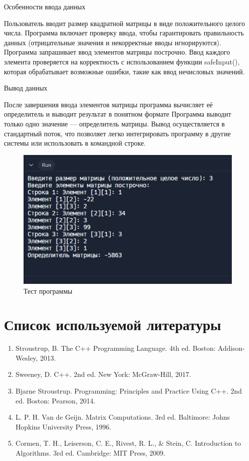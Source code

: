 \documentclass[14pt,a4paper]{scrartcl}
\begin{document}
Особенности ввода данных


Пользователь вводит размер квадратной матрицы в виде положительного целого числа.
Программа включает проверку ввода, чтобы гарантировать правильность данных (отрицательные значения и некорректные вводы игнорируются).
Программа запрашивает ввод элементов матрицы построчно.
Ввод каждого элемента проверяется на корректность с использованием функции safeInput(), которая обрабатывает возможные ошибки, такие как ввод нечисловых значений.


Вывод данных


После завершения ввода элементов матрицы программа вычисляет её определитель и выводит результат в понятном формате
Программа выводит только одно значение — определитель матрицы.
Вывод осуществляется в стандартный поток, что позволяет легко интегрировать программу в другие системы или использовать в командной строке.
\begin{figure}
    \centering
    \includegraphics[width=0.5\linewidth]{image.png}
    \caption{Тест программы}
    \label{fig:enter-label}
\end{figure}
\newpage
\section{Список используемой литературы}

\begin{enumerate}
\item Stroustrup, B. The C++ Programming Language. 4th ed. Boston: Addison-Wesley, 2013.

\item Sweeney, D. C++. 2nd ed. New York: McGraw-Hill, 2017.

\item Bjarne Stroustrup. Programming: Principles and Practice Using C++. 2nd ed. Boston: Pearson, 2014.

\item L. P. H. Van de Geijn. Matrix Computations. 3rd ed. Baltimore: Johns Hopkins University Press, 1996.

\item Cormen, T. H., Leiserson, C. E., Rivest, R. L., & Stein, C. Introduction to Algorithms. 3rd ed. Cambridge: MIT Press, 2009.
\end{enumerate}
\end{document}
